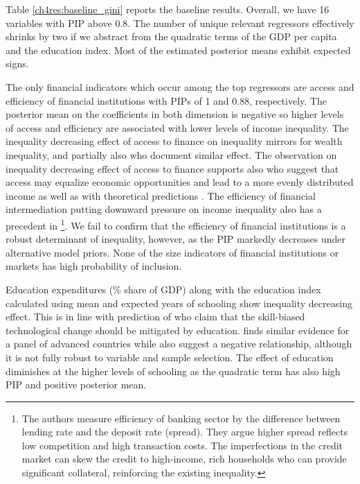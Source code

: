 \begin{refsection}

Table \ref{ch4res:baseline_gini} reports the baseline results. Overall, we have 16 variables with \ac{PIP} above 0.8. The number of unique relevant regressors effectively shrinks by two if we abstract from the quadratic terms of the \ac{GDP} per capita and the education index. Most of the estimated posterior means exhibit expected signs.

The only financial indicators which occur among the top regressors are access and efficiency of financial institutions with \acp{PIP} of 1 and 0.88, respectively. The posterior mean on the coefficients in both dimension is negative so higher levels of access and efficiency are associated with lower levels of income inequality. The inequality decreasing effect of access to finance on inequality mirrors \textcite{hasan2020finance} for wealth inequality, and partially also \textcite{furceri2019robust, naceurzhang2016} who document similar effect. The observation on inequality decreasing effect of access to finance supports also \textcite{claessens2007finance} who suggest that access may equalize economic opportunities and lead to a more evenly distributed income as well as with theoretical predictions \parencite{braunetal2019,galormoav2004,banerjeenewman1990}. The efficiency of financial intermediation putting downward pressure on income inequality also has a precedent in \textcite{gimet2011closer}\footnote{The authors measure efficiency of banking sector by the difference between lending rate and the deposit rate (spread). They argue higher spread reflects low competition and high transaction costs. The imperfections in the credit market can skew the credit to high-income, rich households who can provide significant collateral, reinforcing the existing inequality.}. We fail to confirm that the efficiency of financial institutions is a robust determinant of inequality, however, as the \ac{PIP} markedly decreases under alternative model priors. None of the size indicators of financial institutions or markets has high probability of inclusion.

Education expenditures (\% share of \ac{GDP}) along with the education index calculated using mean and expected years of schooling show inequality decreasing effect. This is in line with prediction of \textcite{goldin2009race,deaton2013great} who claim that the skill-biased technological change should be mitigated by education. \textcite{oecd2011divided} finds similar evidence for a panel of advanced countries while \textcite{furceri2019robust} also suggest a negative relationship, although it is not fully robust to variable and sample selection. The effect of education diminishes at the higher levels of schooling as the quadratic term has also high \ac{PIP} and positive posterior mean. 


\end{refsection}
